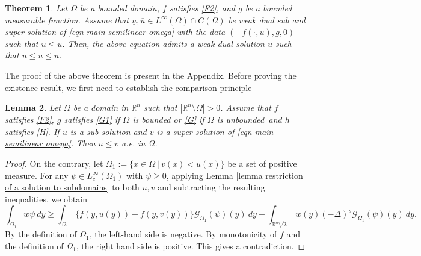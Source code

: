 \documentclass{amsart}
\newtheorem{theorem}{Theorem}[section]
\newtheorem{lemma}[theorem]{Lemma}
\newcommand{\R}{\mathbb{R}}
\newcommand{\slap}{(-\Delta)^{s}}
\newcommand{\g}[1]{\mathcal{G}_{#1}}
\begin{document}
\begin{theorem}\label{thrm sub and super solution method}
    Let $\Omega$ be a bounded domain, $f$ satisfies \ref{F2}, and $g$ be a bounded measurable function. Assume that $\underline{u},\overline{u}\in L^{\infty}(\Omega)\cap C(\Omega)$ be weak dual sub and super solution of \eqref{eqn main semilinear omega} with the data $(-f(\cdot,u),g,0)$
    such that  $\underline{u}\leq \overline{u}$. Then, the above equation admits a weak dual solution $u$ such that $\underline{u}\leq u\leq \overline{u}$. 
\end{theorem}
The proof of the above theorem is present in the Appendix.
Before proving the existence result, we first need to establish the comparison principle
\begin{lemma}\label{lemma comparison principle for semilinear eqn}
     Let $\Omega$ be a domain in $\R^{n}$ such that $|\R^{n}\setminus \Omega|>0$. Assume that $f$ satisfies \ref{F2}, $g$ satisfies \ref{G1} if $\Omega$ is bounded or \ref{G} if $\Omega$ is unbounded\, and $h$ satisfies \ref{H}. If $u$ is a sub-solution and $v$ is a super-solution of \eqref{eqn main semilinear omega}.
Then $u\leq v$ a.e. in $\Omega$.
\end{lemma}
\begin{proof}
    On the contrary, let $\Omega_{1}:=\{x\in\Omega~|~v(x)<u(x)\}$ be a set of positive measure. For any $\psi\in L_{c}^{\infty}(\Omega_{1})$ with $\psi\geq 0$, applying Lemma \ref{lemma restriction of a solution to subdomains} to both $u, v$ and subtracting the resulting inequalities, we obtain  
\begin{equation*}
       \int_{\Omega_{1}}w\psi\ dy\geq \int_{\Omega_{1}}\{f(y,u(y))-f(y,v(y))\}\g{\Omega_{1}}(\psi)(y)\ dy-\int_{\mathbb{\R}^{n}\setminus\overline{\Omega}_{1}}w(y)\slap\g{\Omega_{1}}(\psi)(y)\ dy.
    \end{equation*}
     By the definition of $\Omega_{1}$, the left-hand side is negative.  By monotonicity of $f$ and the definition of $\Omega_{1}$, the right hand side is positive. This gives a contradiction. 
\end{proof}
\end{document}
